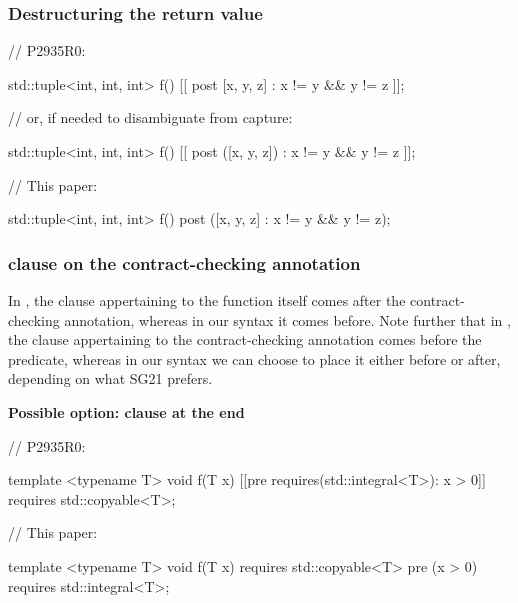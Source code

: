 \subsubsection{Destructuring the return value}
\label{subsubsec:struct}

\begin{minipage}[t]{8cm}
\begin{codeblock}
// P2935R0:

std::tuple<int, int, int> f()
  [[ post [x, y, z] : x != y && y != z ]];
  
// or, if needed to disambiguate from capture:

std::tuple<int, int, int> f()
  [[ post ([x, y, z]) : x != y && y != z ]];
\end{codeblock}
\end{minipage}
\begin{minipage}[t]{8cm}
\begin{codeblock}
// This paper:

std::tuple<int, int, int> f()
  post ([x, y, z] : x != y && y != z);
\end{codeblock}
\end{minipage}

\subsubsection{ clause on the contract-checking annotation}

In \cite{P2935R0}, the  clause appertaining to the function itself comes after the contract-checking annotation, whereas in our syntax it comes before. Note further that in \cite{P2935R0}, the  clause appertaining to the contract-checking annotation comes before the predicate, whereas in our syntax we can choose to place it either before or after, depending on what SG21 prefers.

\textbf{Possible option:  clause at the end}

\begin{minipage}[t]{8cm}
\begin{codeblock}
// P2935R0:

  template <typename T>
  void f(T x)
    [[pre requires(std::integral<T>): x > 0]]
    requires std::copyable<T>;
\end{codeblock}
\end{minipage}
\begin{minipage}[t]{8cm}
\begin{codeblock}
// This paper:

  template <typename T>
  void f(T x)
    requires std::copyable<T>
    pre (x > 0) requires std::integral<T>;
\end{codeblock}
\end{minipage}
\\

